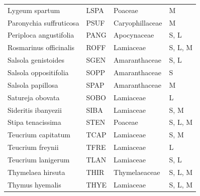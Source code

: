 \documentclass[11pt,twoside]{reedthesis}
\begin{document}
\begin{table}[H]
\begin{tabular}[t]{llll}
Lygeum spartum & LSPA & Poaceae & M\\
Paronychia suffruticosa & PSUF & Caryophillaceae & M\\
Periploca angustifolia & PANG & Apocynaceae & S, L\\
Rosmarinus officinalis & ROFF & Lamiaceae & S, L, M\\
Salsola genistoides & SGEN & Amaranthaceae & S, L\\
Salsola oppositifolia & SOPP & Amaranthaceae & S\\
Salsola papillosa & SPAP & Amaranthaceae & M\\
Satureja obovata & SOBO & Lamiaceae & L\\
Sideritis ibanyezii & SIBA & Lamiaceae & S, M\\
Stipa tenacissima & STEN & Poaceae & S, L, M\\
Teucrium capitatum & TCAP & Lamiaceae & S, M\\
Teucrium freynii & TFRE & Lamiaceae & L\\
Teucrium lanigerum & TLAN & Lamiaceae & S, L\\
Thymelaea hirsuta & THIR & Thymelaeaceae & S, L, M\\
Thymus hyemalis & THYE & Lamiaceae & S, L, M\\
\bottomrule
\end{tabular}
\end{table}
\newpage
\end{document}
